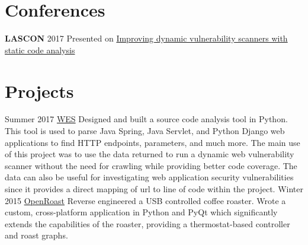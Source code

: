 \documentclass[]{CalebCoffie-CV-Class} %
\begin{document}
\section{Conferences}

\textbf{LASCON} 2017 Presented on \href{http://sched.co/C1HZ}{Improving dynamic vulnerability scanners with static code analysis}




\section{Projects}

\begin{entrylist}
\entry
{Summer 2017}
{\href{https://github.com/indeedsecurity/wes/}{WES}}
{}
{Designed and built a source code analysis tool in Python. This tool is used to parse Java Spring, Java Servlet, and Python Django web applications to find HTTP endpoints, parameters, and much more. The main use of this project was to use the data returned to run a dynamic web vulnerability scanner without the need for crawling while providing better code coverage. The data can also be useful for investigating web application security vulnerabilities since it provides a direct mapping of url to line of code within the project.}
\entry
{Winter 2015}
{\href{https://github.com/Roastero/Openroast/}{OpenRoast}}
{}
{Reverse engineered a USB controlled coffee roaster. Wrote a custom, cross-platform application in Python and PyQt which significantly extends the capabilities of the roaster, providing a thermostat-based controller and roast graphs.}
\end{entrylist}
\end{document}
